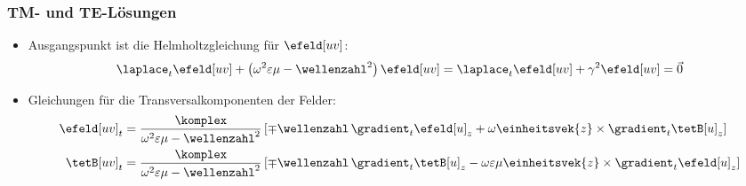 \begin{frame}
  \frametitle{TM- und TE-Lösungen}
  \begin{itemize}[<+->]
  \item Ausgangspunkt ist die \alert{Helmholtzgleichung} für \(\efeld[uv]\):
    \begin{equation*}
      \laplace_t \efeld[uv] + \left(\omega^2\varepsilon\mu -\wellenzahl^2 \right) \efeld[uv] = \laplace_t \efeld[uv] + \gamma^2 \efeld[uv] =  \vec{0}
    \end{equation*}
  \item Gleichungen für die Transversalkomponenten der Felder:
       \begin{align*}
      \efeld[uv]_t &= \frac{\komplex}{\omega^2\varepsilon\mu - \wellenzahl^2} \left[ \mp \wellenzahl\, \gradient_t \efeld[u]_{z} + \omega  \einheitsvek{z}\times\gradient_t \tetB[u]_{z}\right]\\
      \tetB[uv]_t &= \frac{\komplex}{\omega^2\varepsilon\mu - \wellenzahl^2} \left[ \mp \wellenzahl\, \gradient_t \tetB[u]_{z} - \omega\varepsilon\mu  \einheitsvek{z}\times\gradient_t \efeld[u]_{z}\right]
    \end{align*}

  \end{itemize}
\end{frame}


